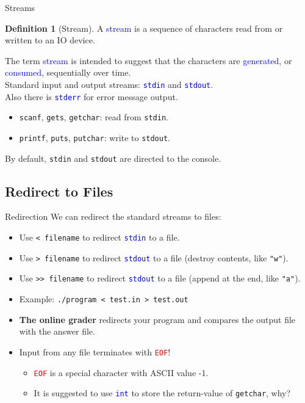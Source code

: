 \documentclass{beamer}
\newcommand{\red}[1]{\textcolor{red}{#1}}
\newcommand{\blue}[1]{\textcolor{blue}{#1}}
\newcommand{\ttt}[1]{\texttt{#1}}
\newcommand{\bluett}[1]{\blue{\ttt{#1}}}
\newcommand{\redtt}[1]{\red{\ttt{#1}}}
\theoremstyle{definition}
\newtheorem{dfn}{Definition}
\begin{document}
\begin{frame}{Streams}
    \begin{dfn}[Stream]
        A \blue{stream} is a sequence of characters read from or written to an IO device.
    \end{dfn}
    The term \blue{stream} is intended to suggest that the characters are \blue{generated}, or \blue{consumed}, sequentially over time.\\
    \pause
    Standard input and output streams: \bluett{stdin} and \bluett{stdout}.\\
    Also there is \bluett{stderr} for error message output.
    \begin{itemize}
        \item \ttt{scanf}, \ttt{gets}, \ttt{getchar}: read from \ttt{stdin}.
        \item \ttt{printf}, \ttt{puts}, \ttt{putchar}: write to \ttt{stdout}.
    \end{itemize}
    By default, \ttt{stdin} and \ttt{stdout} are directed to the console.
\end{frame}

\subsection{Redirect to Files}

\begin{frame}{Redirection}
    We can redirect the standard streams to files:
    \begin{itemize}
        \item Use \ttt{< filename} to redirect \bluett{stdin} to a file.
        \item Use \ttt{> filename} to redirect \bluett{stdout} to a file (destroy contents, like \ttt{"w"}).
        \item Use \ttt{>> filename} to redirect \bluett{stdout} to a file (append at the end, like \ttt{"a"}).
        \pause
        \item Example: \ttt{./program < test.in > test.out}
        \item \textbf{The online grader} redirects your program and compares the output file with the answer file.
        \pause
        \item Input from any file terminates with \redtt{EOF}!
        \begin{itemize}
            \item \redtt{EOF} is a special character with ASCII value -1.
            \item It is suggested to use \bluett{int} to store the return-value of \ttt{getchar}, why?
        \end{itemize}
    \end{itemize}
\end{frame}
\end{document}
